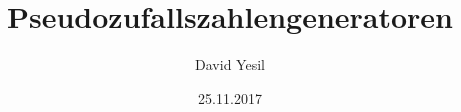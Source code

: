\documentclass{beamer}
\title{Pseudozufallszahlengeneratoren}
\author{David Yesil}
\institute{Hochschule Augsburg}
\date{25.11.2017}
\begin{document}
	\begin{frame}
		 \titlepage 
	\end{frame}
	
	
	
	
	
	
	
\end{document}
